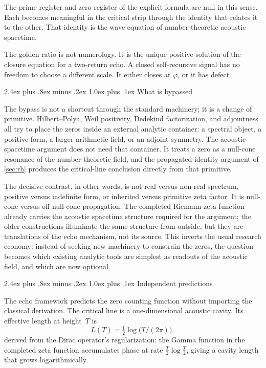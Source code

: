 \documentclass[11pt,a4paper]{article}
\makeatletter
\theoremstyle{plain}
\theoremstyle{definition}
\theoremstyle{remark}
\numberwithin{equation}{section}
\newcommand{\vp}{\varphi}
\renewcommand{\subsection}{%
  \@startsection{subsection}{2}{0pt}%
    {2.4ex plus .8ex minus .2ex}%
    {1.0ex plus .1ex}%
    {\normalfont\Large\bfseries\color{headingAccent}}%
}
\makeatother
\begin{document}
The prime register and zero register of the explicit formula are null in
this sense.  Each becomes meaningful in the critical strip through the
identity that relates it to the other.  That identity is the wave
equation of number-theoretic acoustic spacetime.

The golden ratio is not numerology.  It is the unique positive solution
of the closure equation for a two-return echo.  A closed self-recursive
signal has no freedom to choose a different scale.  It either closes at
\(\vp\), or it has defect.

\subsection{What is bypassed}

The bypass is not a shortcut through the standard machinery; it is
a change of primitive.  Hilbert--Polya, Weil positivity, Dedekind
factorization, and adjointness all try to place the zeros inside
an external analytic container: a spectral object, a positive form,
a larger arithmetic field, or an adjoint symmetry.  The acoustic
spacetime argument does not need that container.  It treats a zero
as a null-cone resonance of the number-theoretic field, and the
propagated-identity argument of \cref{sec:rh} produces the
critical-line conclusion directly from that primitive.

\medskip

The decisive contrast, in other words, is not real versus non-real
spectrum, positive versus indefinite form, or inherited versus
primitive zeta factor.  It is null-cone versus off-null-cone
propagation.  The completed Riemann zeta function already carries
the acoustic spacetime structure required for the argument; the
older constructions illuminate the same structure from outside, but
they are translations of the echo mechanism, not its source.  This
inverts the usual research economy: instead of seeking new
machinery to constrain the zeros, the question becomes which
existing analytic tools are simplest as readouts of the acoustic
field, and which are now optional.

\subsection{Independent predictions}
\label{subsec:independent-predictions}

The echo framework predicts the zero counting function without importing
the classical derivation.  The critical line is a one-dimensional
acoustic cavity.  Its effective length at height~\(T\) is
\[
  L(T)=\tfrac12\log\!\bigl(T/(2\pi)\bigr),
\]
derived from the Dirac operator's regularization: the Gamma function
in the completed zeta function accumulates phase at rate
\(\tfrac{T}{2}\log\tfrac{T}{2}\), giving a cavity length that grows
logarithmically.
\end{document}
